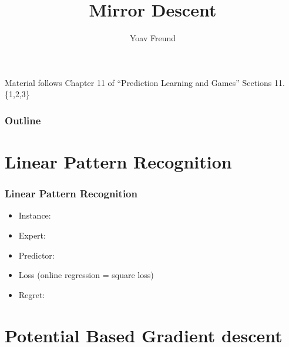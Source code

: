 \documentclass{beamer}
\title[\ouralg] %
{Mirror Descent}
\author[Freund] %
{Yoav Freund}
\institute[Universities of Somewhere and Elsewhere] %
\begin{document}

\begin{frame}
  \titlepage
  \begin{small}
    Material follows Chapter 11 of ``Prediction Learning and
    Games'' Sections 11.\{1,2,3\}
  \end{small}
\end{frame}

\begin{frame}
  \frametitle{Outline}
  \tableofcontents[pausesections]
\end{frame}

\section{Linear Pattern Recognition}
\begin{frame}
  \frametitle{Linear Pattern Recognition}
  \begin{itemize}
  \item Instance: 
  \item Expert: 
  \item Predictor: 
  \item Loss  (online regression = square loss)
  \item Regret: 
  \end{itemize}
\end{frame}

\section{Potential Based Gradient descent}
\end{document}
